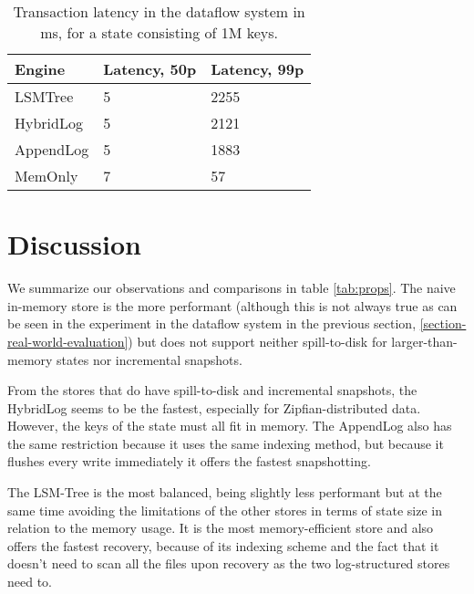 \begin{table}[]
\centering
\begin{tabular}{@{}lll@{}}
\toprule
\textbf{Engine} & \textbf{Latency, 50p} & \textbf{Latency, 99p} \\ \midrule
LSMTree & 5 & 2255 \\
HybridLog & 5 & 2121 \\
AppendLog & 5 & 1883 \\
MemOnly & 7 & 57 \\ \bottomrule
\end{tabular}
\caption{Transaction latency in the dataflow system in ms, for a state consisting of 1M keys.}
\label{tab:latencies}
\end{table}

\section{Discussion}

We summarize our observations and comparisons in table \ref{tab:props}. The naive in-memory store is the more performant (although this is not always true as can be seen in the experiment in the dataflow system in the previous section, \ref{section-real-world-evaluation}) but does not support neither spill-to-disk for larger-than-memory states nor incremental snapshots.

From the stores that do have spill-to-disk and incremental snapshots, the HybridLog seems to be the fastest, especially for Zipfian-distributed data. However, the keys of the state must all fit in memory. The AppendLog also has the same restriction because it uses the same indexing method, but because it flushes every write immediately it offers the fastest snapshotting.

The LSM-Tree is the most balanced, being slightly less performant but at the same time avoiding the limitations of the other stores in terms of state size in relation to the memory usage. It is the most memory-efficient store and also offers the fastest recovery, because of its indexing scheme and the fact that it doesn't need to scan all the files upon recovery as the two log-structured stores need to.

